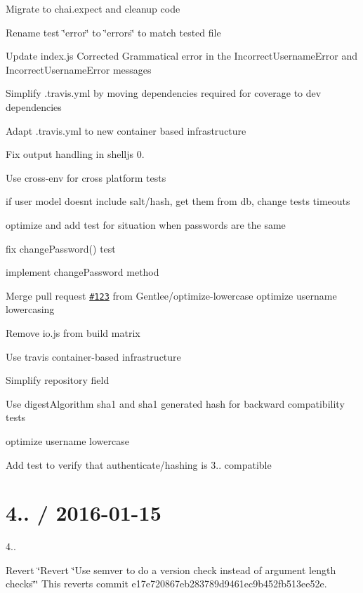\begin{DoxyItemize}
\item Migrate to chai.\+expect and cleanup code
\item Rename test \char`\"{}error\char`\"{} to \char`\"{}errors\char`\"{} to match tested file
\item Update index.\+js Corrected Grammatical error in the Incorrect\+Username\+Error and Incorrect\+Username\+Error messages
\item Simplify .travis.\+yml by moving dependencies required for coverage to dev dependencies
\item Adapt .travis.\+yml to new container based infrastructure
\item Fix output handling in shelljs 0.
\item Use cross-\/env for cross platform tests
\item if user model doesn\textquotesingle{}t include salt/hash, get them from db, change tests timeouts
\item optimize and add test for situation when passwords are the same
\item fix change\+Password() test
\item implement change\+Password method
\item Merge pull request \href{https://github.com/saintedlama/passport-local-mongoose/issues/123}{\tt \#123} from Gentlee/optimize-\/lowercase optimize username lowercasing
\item Remove io.\+js from build matrix
\item Use travis container-\/based infrastructure
\item Simplify repository field
\item Use digest\+Algorithm sha1 and sha1 generated hash for backward compatibility tests
\item optimize username lowercase
\item Add test to verify that authenticate/hashing is 3.. compatible
\end{DoxyItemize}

\section*{4.. / 2016-\/01-\/15 }


\begin{DoxyItemize}
\item 4..
\item Revert \char`\"{}\+Revert \char`\"{}Use semver to do a version check instead of argument length checks\char`\"{}\char`\"{} This reverts commit e17e720867eb283789d9461ec9b452fb513ee52e.
\end{DoxyItemize}

